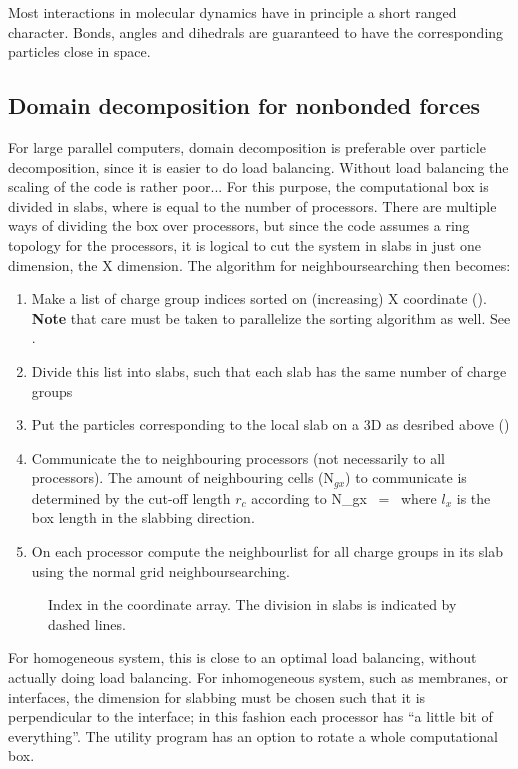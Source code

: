 Most interactions in molecular dynamics have in principle a short ranged character.
Bonds, angles and dihedrals are guaranteed to have the corresponding particles 
close in space.


\subsection{Domain decomposition for nonbonded forces}
For large parallel computers, domain decomposition is preferable over particle
decomposition, since it is easier to do load balancing. Without load balancing
the scaling of the code is rather poor...
For this purpose, the computational box is divided in {\nproc} slabs, where {\nproc}
is equal to the number of processors. There are multiple ways of dividing the box
over processors, but since the {\gromacs} code assumes
a ring topology for the processors, it is logical to cut the system in slabs in
just one dimension, the X dimension. 
The algorithm for neighboursearching then becomes:
\begin{enumerate}
\item	Make a list of charge group indices sorted on (increasing) X coordinate
	().
	{\bf Note} that care must be taken to parallelize the sorting algorithm
	as well. See .
\item	Divide this list into slabs, such that each slab has the same number of
	charge groups
\item	Put the particles corresponding to the local slab on a 3D {\nsgrid} as 
	desribed above ()
\item	Communicate the {\nsgrid} to neighbouring processors (not necessarily to all
	processors). The amount of neighbouring {\nsgrid} cells (N$_{gx}$) to 
	communicate is determined by the cut-off length $r_c$ according to
	\beq
	N_{gx}	~=~	   
	\eeq
	where $l_x$ is the box length in the slabbing direction. 
\item	On each processor compute the neighbourlist for all charge groups in
	its slab using the normal grid neighboursearching.
\end{enumerate}

\begin{figure}
\centerline{}
\caption{Index in the coordinate array. The division in slabs is indicated by dashed lines.}
\label{fig:parsort}
\end{figure}

For homogeneous system, this is close to an optimal load balancing, without 
actually doing load balancing. For inhomogeneous system, such as membranes, or 
interfaces, the dimension for slabbing must be chosen such that it is perpendicular
to the interface; in this fashion each processor has ``a little bit of everything''.
The {\gromacs} utility program  has an option to rotate a whole
computational box.

